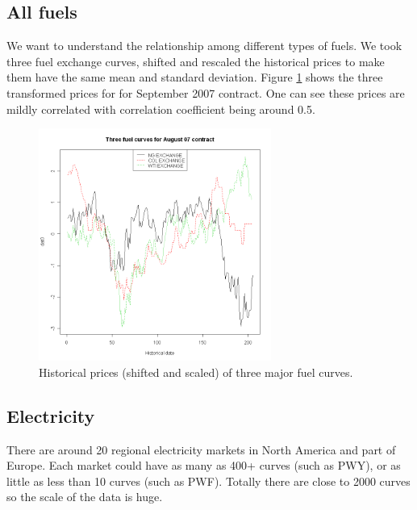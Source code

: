 \subsection{All fuels}
We want to understand the relationship among different 
types of fuels. We took three fuel exchange curves, 
shifted and rescaled the historical prices to make them 
have the same mean and standard deviation.
Figure \ref{allfuel} shows the three transformed  prices for 
for September 2007 contract. 
One can see these prices are mildly correlated 
with correlation coefficient being around 0.5. 
\begin{figure}[htbp]
\centering
\includegraphics[width=3in, height=3in]{figures/allfuels.png}
\caption{Historical prices (shifted and scaled) of
three major fuel curves.}
\label{allfuel}
\end{figure}

\subsection{Electricity}
There are around 20 regional electricity markets in North America
and part of Europe. Each market could have as many as 400+ 
curves (such as PWY), or as little as less than 10 curves 
(such as PWF). Totally there are close to 2000 curves 
so the scale of the data is huge. 

